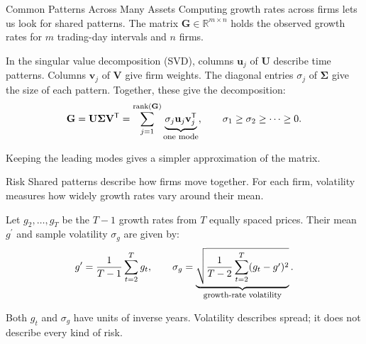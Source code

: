 \documentclass[aspectratio=169,11pt]{beamer}
\begin{document}
\begin{frame}{Common Patterns Across Many Assets}
  Computing growth rates across firms lets us look for shared patterns.
  The matrix $\mathbf G\in\mathbb R^{m\times n}$ holds the observed growth rates
  for $m$ trading-day intervals and $n$ firms.

  In the singular value decomposition (SVD), columns $\mathbf u_j$ of
  $\mathbf U$ describe time patterns. Columns $\mathbf v_j$ of $\mathbf V$
  give firm weights. The diagonal entries $\sigma_j$ of $\boldsymbol\Sigma$
  give the size of each pattern. Together, these give the decomposition:
  \[
    \mathbf G=\mathbf U\boldsymbol\Sigma\mathbf V^{\mathsf T}
    =\sum_{j=1}^{\operatorname{rank}(\mathbf G)}
      \underbrace{\sigma_j\mathbf u_j\mathbf v_j^{\mathsf T}}_{\text{\footnotesize one mode}},
    \qquad \sigma_1\geq\sigma_2\geq\cdots\geq0.
  \]

  Keeping the leading modes gives a simpler approximation of the matrix.

\end{frame}

\begin{frame}{Risk}
  Shared patterns describe how firms move together. For each firm,
  volatility measures how widely growth rates vary around their mean.

  Let $g_2,\ldots,g_T$ be the $T-1$ growth rates from $T$ equally spaced
  prices. Their mean $g^{\prime}$ and sample volatility $\sigma_g$ are given by:
  \[
    g^{\prime}=\frac{1}{T-1}\sum_{t=2}^{T}g_t,
    \qquad
    \sigma_g=
    \underbrace{\sqrt{\frac{1}{T-2}\sum_{t=2}^{T}(g_t-g^{\prime})^2}}_{\text{\footnotesize growth-rate volatility}}.
  \]

  \vspace{0.6em}
  Both $g_t$ and $\sigma_g$ have units of inverse years.
  Volatility describes spread; it does not describe every kind of risk.
\end{frame}
\end{document}
